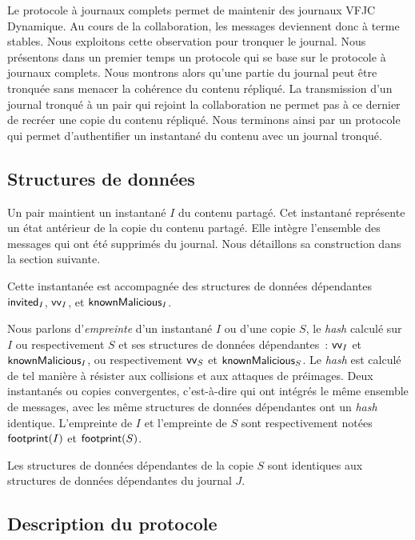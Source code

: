 Le protocole à journaux complets permet de maintenir des journaux \acl{VFJC} Dynamique.
Au cours de la collaboration, les messages deviennent donc à terme stables.
Nous exploitons cette observation pour tronquer le journal.
Nous présentons dans un premier temps un protocole qui se base sur le protocole à journaux complets.
Nous montrons alors qu'une partie du journal peut être tronquée sans menacer la cohérence du contenu répliqué.
La transmission d'un journal tronqué à un pair qui rejoint la collaboration ne permet pas à ce dernier de recréer une copie du contenu répliqué.
Nous terminons ainsi par un protocole qui permet d'authentifier un instantané du contenu avec un journal tronqué.

\subsection{Structures de données}

Un pair maintient un instantané $I$ du contenu partagé.
Cet instantané représente un état antérieur de la copie du contenu partagé.
Elle intègre l'ensemble des messages qui ont été supprimés du journal.
Nous détaillons sa construction dans la section suivante.

Cette instantanée est accompagnée des structures de données dépendantes $\operatorname{\mathsf{invited}}_I$, $\operatorname{\mathsf{vv}}_I$, et $\operatorname{\mathsf{knownMalicious}}_I$.


Nous parlons d'\emph{empreinte} d'un instantané $I$ ou d'une copie $S$, le \emph{hash} calculé sur $I$ ou respectivement $S$ et ses structures de données dépendantes~: $\operatorname{\mathsf{vv}}_I$ et $\operatorname{\mathsf{knownMalicious}}_I$, ou respectivement $\operatorname{\mathsf{vv}}_S$ et $\operatorname{\mathsf{knownMalicious}}_S$.
Le \emph{hash} est calculé de tel manière à résister aux collisions et aux attaques de préimages.
Deux instantanés ou copies convergentes, c'est-à-dire qui ont intégrés le même ensemble de messages, avec les même structures de données dépendantes ont un \emph{hash} identique.
L'empreinte de $I$ et l'empreinte de $S$ sont respectivement notées $\operatorname{\mathsf{footprint}}(I)$ et $\operatorname{\mathsf{footprint}}(S)$.

Les structures de données dépendantes de la copie $S$ sont identiques aux structures de données dépendantes du journal $J$.


\subsection{Description du protocole}

